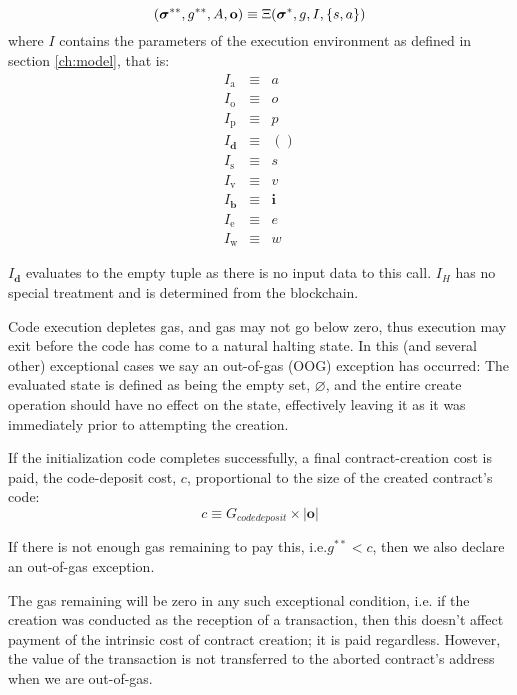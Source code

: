 \documentclass[9pt,oneside]{amsart}
\makeatletter
\newcommand*\ie{i.e.\@\xspace}
\makeatother
\begin{document}
\begin{multicols}{2}
\begin{equation}
(\boldsymbol{\sigma}^{**}, g^{**}, A, \mathbf{o}) \equiv \Xi(\boldsymbol{\sigma}^*, g, I, \{s, a\}) \\
\end{equation}
\pagebreak[1]where $I$ contains the parameters of the execution environment as defined in section \ref{ch:model}, that is:\pagebreak[1]
\begin{eqnarray}
I_{\mathrm{a}} & \equiv & a \\
I_{\mathrm{o}} & \equiv & o \\
I_{\mathrm{p}} & \equiv & p \\
I_{\mathbf{d}} & \equiv & () \\
I_{\mathrm{s}} & \equiv & s \\
I_{\mathrm{v}} & \equiv & v \\
I_{\mathbf{b}} & \equiv & \mathbf{i} \\
I_{\mathrm{e}} & \equiv & e \\
I_{\mathrm{w}} & \equiv & w
\end{eqnarray}

$I_{\mathbf{d}}$ evaluates to the empty tuple as there is no input data to this call. $I_{H}$ has no special treatment and is determined from the blockchain.

Code execution depletes gas, and gas may not go below zero, thus execution may exit before the code has come to a natural halting state. In this (and several other) exceptional cases we say an out-of-gas (OOG) exception has occurred: The evaluated state is defined as being the empty set, $\varnothing$, and the entire create operation should have no effect on the state, effectively leaving it as it was immediately prior to attempting the creation.

If the initialization code completes successfully, a final contract-creation cost is paid, the code-deposit cost, $c$, proportional to the size of the created contract's code:
\begin{equation}
c \equiv G_{codedeposit} \times |\mathbf{o}|
\end{equation}

If there is not enough gas remaining to pay this, \ie $g^{**} < c$, then we also declare an out-of-gas exception.

The gas remaining will be zero in any such exceptional condition, \ie if the creation was conducted as the reception of a transaction, then this doesn't affect payment of the intrinsic cost of contract creation; it is paid regardless. However, the value of the transaction is not transferred to the aborted contract's address when we are out-of-gas.


\end{multicols}
\end{document}
